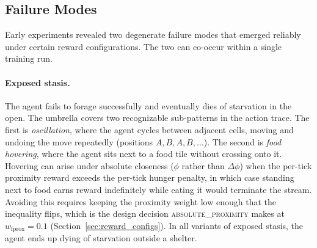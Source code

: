\documentclass[12pt,a4paper,titlepage]{article}
\begin{document}
\subsection{Failure Modes}
\label{sec:failure_modes}

Early experiments revealed two degenerate failure modes that emerged reliably under certain reward configurations. The two can co-occur within a single training run.

\paragraph{Exposed stasis.} The agent fails to forage successfully and eventually dies of starvation in the open. The umbrella covers two recognizable sub-patterns in the action trace. The first is \emph{oscillation}, where the agent cycles between adjacent cells, moving and undoing the move repeatedly (positions $A,B,A,B,\ldots$). The second is \emph{food hovering}, where the agent sits next to a food tile without crossing onto it. Hovering can arise under absolute closeness ($\phi$ rather than $\Delta\phi$) when the per-tick proximity reward exceeds the per-tick hunger penalty, in which case standing next to food earns reward indefinitely while eating it would terminate the stream. Avoiding this requires keeping the proximity weight low enough that the inequality flips, which is the design decision \textsc{absolute\_proximity} makes at $w_\text{fprox} = 0.1$ (Section~\ref{sec:reward_configs}). In all variants of exposed stasis, the agent ends up dying of starvation outside a shelter.
\end{document}
